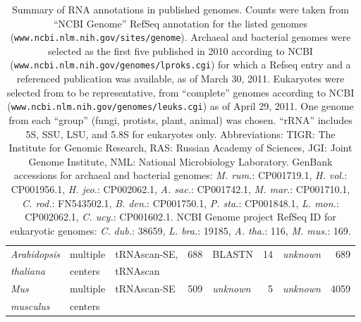 \begin{footnotesize}
\begin{center}
\begin{table}
\begin{tabular}{|ll|lr|lr|lr|}
\emph{Arabidopsis}                       & multiple          & tRNAscan-SE,  & 688      & BLASTN         & 14 & \emph{unknown} & 689      \\
\emph{thaliana}                          & centers           & tRNAscan      &          &                &    &                &          \\ \hline
\emph{Mus}                               & multiple          & tRNAscan-SE   & 509  & \emph{unknown} & 5  & \emph{unknown} & 4059 \\
\emph{musculus}                          & centers           &               &          &                &    &                &          \\ %
\hline
\end{tabular}

\caption{Summary of RNA annotations in published genomes.  Counts were
  taken from ``NCBI Genome'' RefSeq annotation for the listed genomes
  (\texttt{www.ncbi.nlm.nih.gov/sites/genome}). Archaeal and
  bacterial genomes were selected as the first five published in 2010
  according to NCBI
  (\texttt{www.ncbi.nlm.nih.gov/genomes/lproks.cgi}) for which
  a Refseq entry and a referenced publication was available, as of
  March 30, 2011. Eukaryotes were selected from to be representative,
  from ``complete'' genomes according to NCBI
  (\texttt{www.ncbi.nlm.nih.gov/genomes/leuks.cgi}) as of April
  29, 2011.  One genome from each ``group'' (fungi, protists, plant,
  animal) was chosen.  ``rRNA'' includes 5S, SSU, LSU, and 5.8S for
  eukaryotes only. Abbreviations: TIGR: The Institute for Genomic
  Research, RAS: Russian Academy of Sciences, JGI: Joint Genome
  Institute, NML: National Microbiology Laboratory.
  GenBank accessions for archaeal and bacterial genomes:
  \emph{M. rum.}:    CP001719.1,
  \emph{H. vol.}:       CP001956.1,
  \emph{H. jeo.}:       CP002062.1,
  \emph{A. sac.}: CP001742.1,
  \emph{M. mar.}:   CP001710.1,
  \emph{C. rod.}:      FN543502.1,
  \emph{B. den.}:        CP001750.1,
  \emph{P. sta.}:        CP001848.1,
  \emph{L. mon.}:  CP002062.1,
  \emph{C. ucy.}:         CP001602.1.
  NCBI Genome project RefSeq ID for eukaryotic genomes:
  \emph{C. dub.}:   38659,
  \emph{L. bra.}:   19185,
  \emph{A. tha.}:       116,
  \emph{M. mus.}:       169.}
\end{table}
\end{center}
\end{footnotesize}

